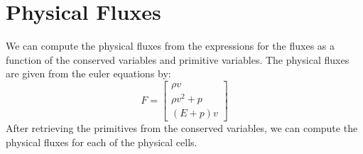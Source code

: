 \section{Physical Fluxes}
We can compute the physical fluxes from the expressions for the fluxes as a function of the conserved variables and primitive variables. The physical fluxes are given from the euler equations by:
$$F = \begin{bmatrix} \rho v\\ \rho v^2 +p \\ (E+p)v \end{bmatrix}$$
After retrieving the primitives from the conserved variables, we can compute the physical fluxes for each of the physical cells. 
